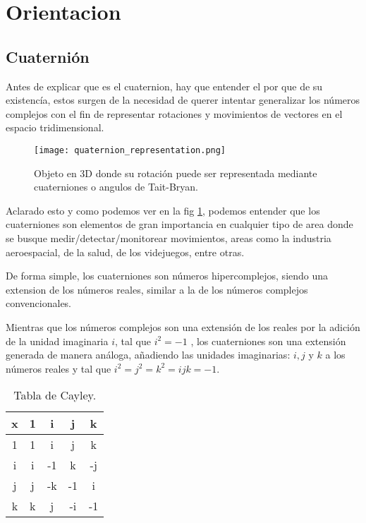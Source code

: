
\section{Orientacion}

    \subsection{Cuaternión}
        Antes de explicar que es el cuaternion, hay que entender el por que de su existencía, estos surgen de la necesidad de
        querer intentar generalizar los números complejos con el fin de representar rotaciones y movimientos de vectores en el espacio 
        tridimensional.
        \begin{figure}[htp!]
            \centering
            \texttt{[image: quaternion\_representation.png]}
            \caption{Objeto en 3D donde su rotación puede ser representada mediante cuaterniones o angulos de Tait-Bryan.}
            \label{fig: rotation_representation}
        \end{figure}
        \FloatBarrier

        Aclarado esto y como podemos ver en la fig \ref{fig: rotation_representation}, podemos entender que los cuaterniones son elementos
        de gran importancia en cualquier tipo de area donde se busque
        medir/detectar/monitorear movimientos, areas como la industria aeroespacial, de la salud, de los videjuegos, entre otras. 

        De forma simple, los cuaterniones son números hipercomplejos, siendo una extension de los números reales, similar a la de los números complejos convencionales.
        
        Mientras que los números complejos son una extensión de los reales por la adición de la unidad imaginaria \textbf{$ i $}, tal que \textbf{$ i^2 = -1 $}
        , los cuaterniones son una extensión generada de manera análoga, añadiendo las unidades imaginarias: $i, j$ y $ k $ a los números reales 
        y tal que $ i^2 = j^2 = k^2 = ijk = -1$.

            \begin{table}[htp]
                \centering
                    \begin{tabular}{|c|c|c|c|c|}
                        \hline
                        \textbf{x} & 1 & i  & j  & k \\ \hline
                             1 & 1 & i  & j  & k \\ \hline
                             i & i & -1 & k  & -j \\ \hline
                             j & j & -k & -1 & i \\ \hline
                             k & k & j  & -i & -1 \\ 
                        \hline
                    \end{tabular}
                \caption{Tabla de Cayley.}
                \label{table: Cayley}
            \end{table}

